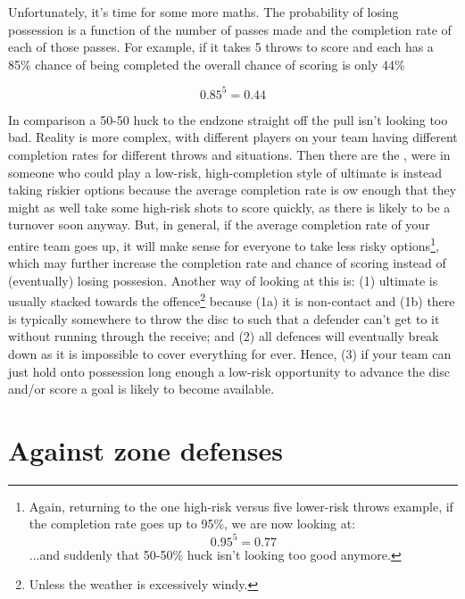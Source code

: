 \documentclass{tufte-handout}
\begin{document}
Unfortunately, it's time for some more maths. 
The probability 
of losing possession
is a function of 
the number of passes made 
and the completion rate of 
each of those passes.
For example,  
if it takes 5 throws
to score and 
each has a 85\% chance 
of being completed
the overall chance 
of scoring is only 44\%
\begin{marginfigure}
\begin{equation} 0.85^5 = 0.44 \end{equation}
\end{marginfigure} 
In comparison
a 50-50 huck
to the endzone
straight off the pull 
isn't looking too bad.
Reality is more complex, 
with different players 
on your team 
having different 
completion rates 
for different throws 
and situations. 
Then there are the 
,  
were in someone who could play a
low-risk, high-completion 
style of ultimate 
is instead taking riskier options 
because the average 
completion rate is 
ow enough that 
they might as well
take some high-risk
shots to score quickly, 
as there is likely to be 
a turnover soon anyway.
But, in general, 
if the average completion rate 
of your entire team goes up, 
it will make sense 
for everyone 
to take less risky options\footnote{
Again, returning to the one high-risk  
versus five lower-risk throws example, 
if the completion rate goes up 
to 95\%, we are now looking at: 
\begin{equation} 0.95^5 = 0.77 \end{equation}
...and suddenly that 50-50\% huck 
isn't looking too good anymore.}, 
which may further 
increase the completion rate
and chance of scoring
instead of 
(eventually)
losing possesion. 
Another way of looking at this 
is: (1) ultimate
is usually stacked towards 
the offence\footnote{
Unless the weather is 
excessively 
windy.} 
because (1a) it is non-contact 
and (1b) there is 
typically 
somewhere
to throw the disc to 
such that a defender 
can't get to it without running 
through the receive; 
and (2) all defences 
will eventually 
break down 
as it is impossible to 
cover everything 
for ever. 
Hence, 
(3) if your team 
can just hold onto
possession 
long enough
a low-risk
opportunity to 
advance the disc 
and/or score a goal 
is likely to 
become 
available. 

\section{Against zone defenses}
\end{document}

